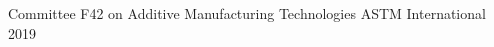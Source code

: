 \begin{cventries}

\cventry
{Committee F42 on Additive Manufacturing Technologies}
{ASTM International}
{}
{2019}
{}

\end{cventries}
